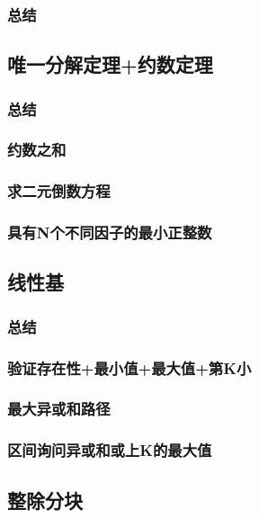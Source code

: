 \documentclass[10pt,a4paper]{article}
\begin{document}
	\subsubsection{总结}
	

	\subsection{唯一分解定理+约数定理}
	\subsubsection{总结}
	
	\subsubsection{约数之和}
	
	\subsubsection{求二元倒数方程}
	
	\subsubsection{具有N个不同因子的最小正整数}
	
	\subsection{线性基}
	\subsubsection{总结}
	
	\subsubsection{验证存在性+最小值+最大值+第K小}
	
	\subsubsection{最大异或和路径}
	
	\subsubsection{区间询问异或和或上K的最大值}
	
	\subsection{整除分块}
\end{document}
